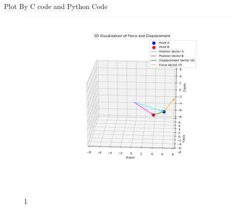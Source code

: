 \documentclass{beamer}
\begin{document}
\begin{frame}{Plot By C code and Python Code}
    \begin{figure}
    \centering
    \includegraphics[width=0.7\columnwidth]{figs/Figure_1.png}
    \label{fig:placeholder}
    \caption{1}
\end{figure}
\end{frame}
\end{document}
